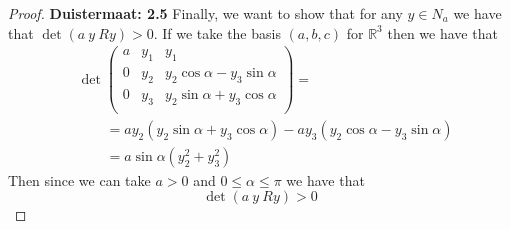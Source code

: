 \documentclass[11pt]{article}
\newcommand{\R}{\mathbb{R}}
\theoremstyle{definition}
\begin{document}
\begin{proof}{\textbf{Duistermaat: 2.5}}
    Finally, we want to show that for any $y \in N_a$ we have that
    $\det(a~y~Ry) > 0$. If we take the basis $(a,b,c)$ for $\R^3$ then we have
    that
    \begin{align*}
        &\det\begin{pmatrix}
            a & y_1 & y_1\\
            0 & y_2 & y_2\cos\alpha - y_3\sin\alpha\\
            0 & y_3 & y_2\sin\alpha + y_3\cos\alpha\\
        \end{pmatrix} = \\
        &\qquad= ay_2(y_2\sin\alpha + y_3\cos\alpha)
        - ay_3(y_2\cos\alpha - y_3\sin\alpha)\\
        &\qquad= a\sin\alpha(y_2^2 + y_3^2)
    \end{align*}
    Then since we can take $a > 0$ and
    $0 \leq \alpha \leq \pi$ we have that $$\det(a~y~Ry) > 0$$
\end{proof}
\cleardoublepage
\end{document}
